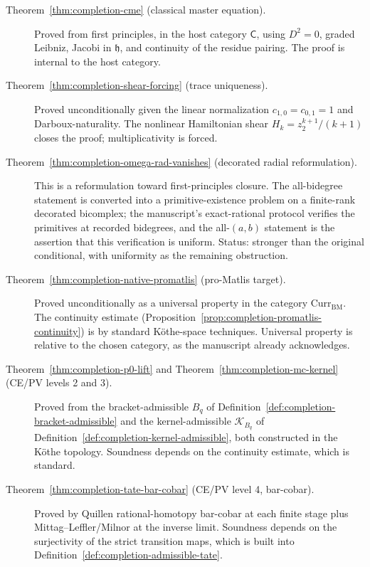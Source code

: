 \begin{description}
\item[Theorem~\ref{thm:completion-cme} (classical master equation).]
  Proved from first principles, in the host category
  \(\mathsf C\), using \(D^2=0\), graded Leibniz, Jacobi in
  \(\mathfrak h\), and continuity of the residue pairing.  The proof is
  internal to the host category.

\item[Theorem~\ref{thm:completion-shear-forcing} (trace
  uniqueness).]  Proved unconditionally given the linear
  normalization \(c_{1,0}=c_{0,1}=1\) and Darboux-naturality.  The
  nonlinear Hamiltonian shear \(H_k=z_2^{k+1}/(k+1)\) closes the
  proof; multiplicativity is forced.

\item[Theorem~\ref{thm:completion-omega-rad-vanishes} (decorated
  radial reformulation).]  This is a reformulation toward
  first-principles closure.  The all-bidegree statement is
  converted into a primitive-existence problem on a finite-rank
  decorated bicomplex; the manuscript's exact-rational protocol
  verifies the primitives at recorded bidegrees, and the
  all-\((a,b)\) statement is the assertion that this
  verification is uniform.
  Status: stronger than the original conditional, with uniformity as the
  remaining obstruction.

\item[Theorem~\ref{thm:completion-native-promatlis} (pro-Matlis
  target).]  Proved unconditionally as a universal property in
  the category \(\mathrm{Curr}_{\mathrm{BM}}\).  The continuity
  estimate (Proposition~\ref{prop:completion-promatlis-continuity})
  is by standard K\"othe-space techniques.  Universal property is
  relative to the chosen category, as the manuscript already
  acknowledges.

\item[Theorem~\ref{thm:completion-p0-lift} and
  Theorem~\ref{thm:completion-mc-kernel} (CE/PV levels 2 and 3).]
  Proved from the bracket-admissible \(B_q\) of
  Definition~\ref{def:completion-bracket-admissible} and the
  kernel-admissible \(\mathcal K_{B_q}\) of
  Definition~\ref{def:completion-kernel-admissible}, both
  constructed in the K\"othe topology.  Soundness depends on the
  continuity estimate, which is standard.

\item[Theorem~\ref{thm:completion-tate-bar-cobar} (CE/PV level 4,
  bar-cobar).]  Proved by Quillen rational-homotopy bar-cobar at
  each finite stage plus Mittag--Leffler/Milnor at the inverse
  limit.  Soundness depends on the surjectivity of the strict
  transition maps, which is built into
  Definition~\ref{def:completion-admissible-tate}.


\end{description}
